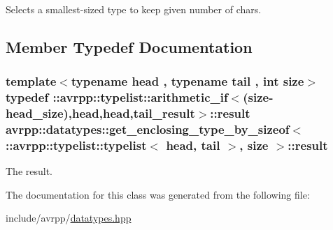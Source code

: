 Selects a smallest-\/sized type to keep given number of chars. 

\subsection{Member Typedef Documentation}
\hypertarget{classavrpp_1_1datatypes_1_1get__enclosing__type__by__sizeof_3_01_1_1avrpp_1_1typelist_1_1typelis9fc0eb4240be8e1020d3e8f1e14a8622_a36a57140c544482d12ea8698b27126d2}{
\subsubsection[{result}]{\setlength{\rightskip}{0pt plus 5cm}template$<$typename head , typename tail , int size$>$ typedef ::{\bf avrpp::typelist::arithmetic\_\-if}$<$(size-\/head\_\-size),head,head,tail\_\-result$>$::{\bf result} avrpp::datatypes::get\_\-enclosing\_\-type\_\-by\_\-sizeof$<$ ::{\bf avrpp::typelist::typelist}$<$ head, tail $>$, size $>$::{\bf result}}}
\label{classavrpp_1_1datatypes_1_1get__enclosing__type__by__sizeof_3_01_1_1avrpp_1_1typelist_1_1typelis9fc0eb4240be8e1020d3e8f1e14a8622_a36a57140c544482d12ea8698b27126d2}


The result. 



The documentation for this class was generated from the following file:\begin{DoxyCompactItemize}
\item 
include/avrpp/\hyperlink{datatypes_8hpp}{datatypes.hpp}\end{DoxyCompactItemize}
